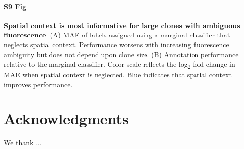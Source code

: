 \documentclass[10pt,letterpaper]{article}
\begin{document}
\paragraph*{S9 Fig} 
\label{S9_Fig}
{\bf Spatial context is most informative for large clones with ambiguous fluorescence.} (A) MAE of labels assigned using a marginal classifier that neglects spatial context. Performance worsens with increasing fluorescence ambiguity but does not depend upon clone size. (B) Annotation performance relative to the marginal classifier. Color scale reflects the log\textsubscript{2} fold-change in MAE when spatial context is neglected. Blue indicates that spatial context improves performance.



\section*{Acknowledgments}
We thank ...

\nolinenumbers

%
%
% 
\end{document}
